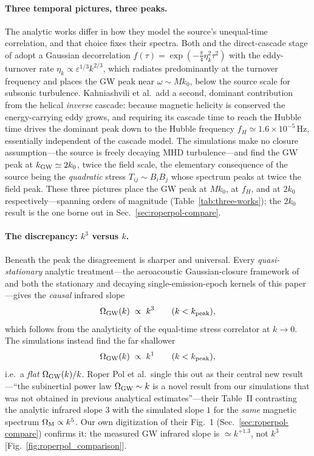 \documentclass[10pt,prd,aps,nobibnotes,superscriptaddress,preprintnumbers,notitlepage]{revtex4-1}
\begin{document}
\paragraph{Three temporal pictures, three peaks.} The analytic works differ in how they
model the source's unequal-time correlation, and that choice fixes their spectra. Both
\cite{Gogoberidze:2007an} and the direct-cascade stage of \cite{Kahniashvili:2008pe} adopt a
Gaussian decorrelation $f(\tau)=\exp(-\tfrac{\pi}{4}\eta_k^2\tau^2)$ with the eddy-turnover
rate $\eta_k\propto\varepsilon^{1/3}k^{2/3}$, which radiates predominantly at the turnover
frequency and places the GW peak near $\omega\sim Mk_0$, below the source scale for subsonic
turbulence. Kahniashvili et al.\ add a second, dominant contribution from the helical
\emph{inverse} cascade: because magnetic helicity is conserved the energy-carrying eddy
grows, and requiring its cascade time to reach the Hubble time drives the dominant peak down
to the Hubble frequency $f_H\simeq1.6\times10^{-5}\,$Hz, essentially independent of the
cascade model. The simulations \cite{RoperPol:2019wvy} make no closure assumption---the source
is freely decaying MHD turbulence---and find the GW peak at $k_{\rm GW}\simeq2k_0$, twice the
field scale, the elementary consequence of the source being the \emph{quadratic} stress
$T_{ij}\sim B_iB_j$ whose spectrum peaks at twice the field peak. These three pictures place
the GW peak at $Mk_0$, at $f_H$, and at $2k_0$ respectively---spanning orders of magnitude
(Table~\ref{tab:three-works}); the $2k_0$ result is the one borne out in
Sec.~\ref{sec:roperpol-compare}.

\paragraph{The discrepancy: $k^3$ versus $k$.} Beneath the peak the disagreement is sharper
and universal. Every \emph{quasi-stationary} analytic treatment---the aeroacoustic
Gaussian-closure framework of \cite{Gogoberidze:2007an,Kahniashvili:2008pe} and both the stationary
and decaying single-emission-epoch kernels of this paper---gives the \emph{causal} infrared
slope
\begin{equation}
  \Omega_{\rm GW}(k)\;\propto\;k^3 \qquad (k<k_{\rm peak}),
  \label{eq:ir-causal}
\end{equation}
which follows from the analyticity of the equal-time stress correlator at $k\to0$. The
simulations instead find the far shallower
\begin{equation}
  \Omega_{\rm GW}(k)\;\propto\;k^1 \qquad (k<k_{\rm peak}),
  \label{eq:ir-sim}
\end{equation}
i.e.\ a \emph{flat} $\Omega_{\rm GW}(k)/k$. Roper Pol et al.\ single this out as their central
new result---``the subinertial power law $\Omega_{\rm GW}\sim k$ is a novel result from our
simulations that was not obtained in previous analytical estimates''---their Table~II
contrasting the analytic infrared slope $3$ with the simulated slope $1$ for the \emph{same}
magnetic spectrum $\Omega_{\rm M}\propto k^5$. Our own digitization of their Fig.~1
(Sec.~\ref{sec:roperpol-compare}) confirms it: the measured GW infrared slope is
$\simeq k^{+1.3}$, not $k^3$ [Fig.~\ref{fig:roperpol_comparison}].
\end{document}
